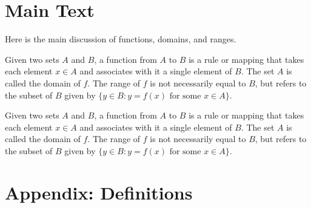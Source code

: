 \documentclass{article}
\newcommand{\appendixdefs}{}
\newcommand{\printappendixdefs}{
    \newpage
    \section*{Appendix: Definitions}
    \appendixdefs
}
\begin{document}
\section{Main Text}

Here is the main discussion of functions, domains, and ranges.

\begin{storedefinition}
    Given two sets \(A\) and \(B\), a function from \(A\) to \(B\) is a rule or mapping that takes each element \(x \in A\) and associates with it a single element of \(B\).
    The set \(A\) is called the domain of \(f\).
    The range of \(f\) is not necessarily equal to \(B\), but refers to the subset of \(B\) given by \(\{y \in B : y = f(x) \text{ for some } x \in A\}\).
\end{storedefinition}
\begin{storedefinition}
    Given two sets \(A\) and \(B\), a function from \(A\) to \(B\) is a rule or mapping that takes each element \(x \in A\) and associates with it a single element of \(B\).
    The set \(A\) is called the domain of \(f\).
    The range of \(f\) is not necessarily equal to \(B\), but refers to the subset of \(B\) given by \(\{y \in B : y = f(x) \text{ for some } x \in A\}\).
\end{storedefinition}

\printappendixdefs
\end{document}
